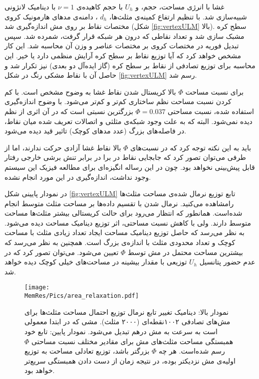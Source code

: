 غشا با انرژی مساحت، حجم، و 
$U_h$
با حجم کاهیده‌ی 
$\nu=1$
با دینامیک لانژونی شبیه‌سازی شد. با تنظیم ارتفاع کمینه‌ی مثلث‌ها، 
$d_h$
، دامنه‌ی مد‌های هارمونیک کروی مختصات نقاط بر روی مش اندازه‌گیری شد (شکل
\ref{fig:vertexULM}
بالا).  سطح کره مشبک سازی شد و تعداد نقاطی که درون هر شبکه‌ قرار گرفت، شمرده شد. سپس تبدیل فوریه در مختصات کروی بر مختصات عناصر  و وزن آن محاسبه‌ شد. این کار مشخص خواهد کرد که آیا توزیع نقاط بر سطح کره آرایش منظمی دارد یا خیر. این محاسبه برای توزیع تصادفی از نقاط بر سطح کره (گاز ایده‌آل دو بعدی) نیز تکرار شد و حاصل آن با نقاط مشکی رنگ در شکل
\ref{fig:vertexULM}
رسم شد. 


برای نسبت مساحت 
$\Phi$
بالا کریستال شدن نقاط غشا به وضوح مشخص است. با کم کردن نسبت مساحت نظم ساختاری کم‌تر و کم‌تر می‌شود. با وضوح اندازه‌گیری استفاده شده، نسبت مساحتی 
$\Phi=0.037$
بزرگترین نسبتی است که در آن اثری از نظم دیده نمی‌شود. البته که به علت وجود شبکه‌ی مثلثی و اتصالات تعریف شده میان نقاط، در فاصله‌های بزرگ (عدد مد‌های کوچک) تاثیر قید دیده می‌شود. 

باید به این نکته توجه کرد که در نسبت‌های
$\Phi$
بالا نقاط غشا آزادی حرکت ندارند، اما از طرفی می‌توان تصور کرد که جابجایی نقاط در برا در برابر تنش‌ برشی خارجی رفتار قابل پیش‌بینی نخواهد بود. چون در این رساله انگیزه‌‌ای برای مطالعه فیزیک این سیستم وجود نداشت، اندازه‌گیری  در این مورد انجام نشده.


در  نمودار پایینی شکل 
\ref{fig:vertexULM}
 تابع توزیع نرمال شده‌ی مساحت مثلث‌ها رامشاهده می‌کنید. نرمال شدن با تقسیم داده‌ها بر مساحت مثلث متوسط انجام شده‌است. همانطور که انتظار می‌رود برای حالت کریستالی بیشتر مثلث‌ها مساحت متوسط دارند. ولی با کاهش نسبت مساحتی،‌ اثر توزیع دینامیک مساحت دیده می‌شود. به نظر می‌رسد که حاصل توزیع دینامیک مساحت  ایجاد تعداد زیادی مثلث با مساحت کوچک و تعداد محدودی مثلث با اندازه‌ی بزرگ است. همچنین به نظر می‌رسد که بیشترین مساحت محتمل در مش  توسط 
 $\Phi$
  تعیین می‌شود. می‌توان تصور کرد که در عدم حضور پتانسیل 
$U_h$
توزیعی با مقدار بیشینه در مساحت‌های خیلی کوچک دیده‌ خواهد شد.

\begin{figure}[htbp]
\begin{center}
\texttt{[image: \\MemRes/Pics/area\_relaxation.pdf]}
\caption{
نمودار بالا: دینامیک تغییر تابع نرمال توزیع احتمال مساحت مثلث‌ها برای مش‌های  تصادفی ۱۰۰۲نقطه‌ای (۲۰۰۰ مثلث). مشی که در ابتدا معمولی است به سرعت به مش درهم تبدیل می‌شود. نمودار پایین: تابع خود همبستگی مساحت مثلث‌های مش برای مقادیر مختلف نسبت مساحتی
$\Phi$
رسم شده‌است. هر چه 
$\Phi$
بزرگتر باشد، توزیع تعادلی مساحت به توزیع اولیه‌ی مش نزدیکتر بوده، در نتیجه زمان از دست دادن همبستگی سریع‌تر خواهد بود.
}
\label{fig:areaRelaxation}
\end{center}
\end{figure}

